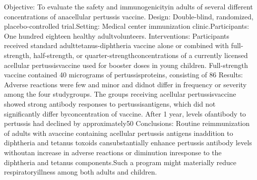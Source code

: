 Objective: To evaluate the safety and immunogenicityin  adults  of  several  different  concentrations  of  anacellular pertussis vaccine.
Design: Double-blind, randomized, placebo-controlled trial.Setting: Medical center immunization clinic.Participants:  One  hundred  eighteen  healthy  adultvolunteers.
Interventions:  Participants  received  standard  adulttetanus-diphtheria vaccine alone or combined with full-strength,    half-strength,    or    quarter-strengthconcentrations of a currently licensed acellular pertussisvaccine used for booster doses in young children. Full-strength vaccine contained 40 micrograms of pertussisproteins, consisting of 86%
Results: Adverse reactions were few and minor and didnot differ in frequency or severity among the four studygroups.  The  groups  receiving  acellular  pertussisvaccine showed strong antibody responses to pertussisantigens,  which  did  not  significantly  differ  byconcentration  of  vaccine.  After  1  year,  levels  ofantibody  to  pertussis  had  declined  by  approximately50%
Conclusions: Routine reimmunization of adults with avaccine  containing  acellular  pertussis  antigens  inaddition  to  diphtheria  and  tetanus  toxoids  cansubstantially enhance pertussis antibody levels withoutan  increase  in  adverse  reactions  or  diminution  inresponse  to  the  diphtheria  and  tetanus  components.Such  a  program  might  materially  reduce  respiratoryillness among both adults and children.

